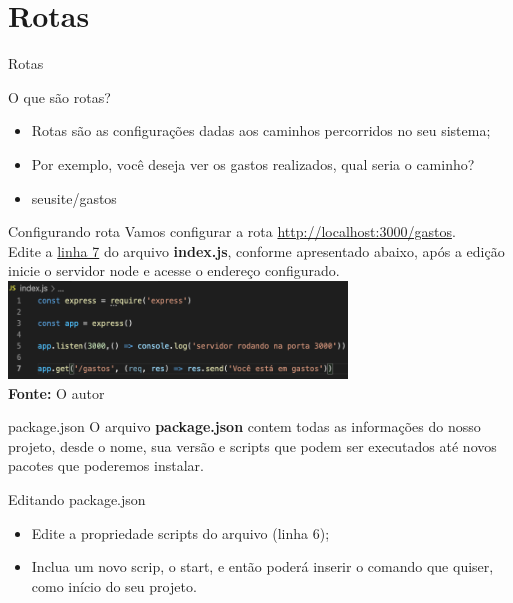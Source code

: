 \documentclass{beamer}
\begin{document}
\section{Rotas}
    \begin{frame}{Rotas}
    \begin{exampleblock}{O que são rotas?}
        	\begin{itemize}
	\item Rotas são as configurações dadas aos caminhos percorridos no seu sistema;
	\item Por exemplo, você deseja ver os gastos realizados, qual seria o caminho?
	\item seusite/gastos
        	\end{itemize}
      \end{exampleblock}
    \end{frame}
\begin{frame}{Configurando rota}
    Vamos configurar a rota
    \url{http://localhost:3000/gastos}.\\
    \vspace{0.5cm}
    Edite a \underline{linha 7} do arquivo \textbf{index.js}, conforme apresentado abaixo, após a edição inicie o servidor node e acesse o endereço configurado.
	\includegraphics[width=90mm]{resources/aula3_1.png}
	\\
    \tiny{\textbf{Fonte:} O autor}
\end{frame}
\begin{frame}{package.json}
	O arquivo \textbf{package.json} contem todas as informações do nosso projeto, desde o nome, sua versão e scripts que podem ser executados até novos pacotes que poderemos instalar.\\
	\begin{exampleblock}{Editando package.json}
	\begin{itemize}
	\item Edite a propriedade scripts do arquivo (linha 6);
	\item Inclua um novo scrip, o start, e então poderá inserir o comando que quiser, como início do seu projeto. 
	\end{itemize}
	\end{exampleblock}
\end{frame}
\end{document}
